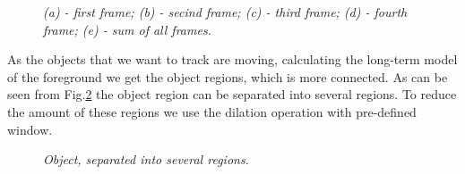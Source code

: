 \documentclass[12pt,a4paper,oneside,titlepage]{article}
\begin{document}
\begin{figure}[h]
\begin{minipage}[h]{0.19\linewidth}
	\end{minipage}

	\caption{\textit{(a) - first frame; (b) - secind frame; (c) - third frame; (d) - fourth frame; (e) - sum of all frames.}}
	\label{fig:frames_and_sum}
\end{figure}



As the objects that we want to track are moving, calculating the long-term model of  the foreground we get the object regions, which is more connected.
As can be seen from Fig.\ref{fig:fig3} the object region can be separated into several regions.
To reduce the amount of these regions we use the dilation operation with pre-defined window.


\begin{figure}[h]
  \caption{\textit{Object, separated into several regions.}}
  \label{fig:fig3}
\end{figure}
\end{document}
